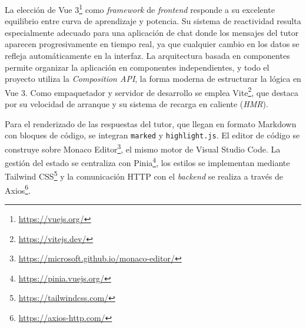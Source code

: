 La elección de Vue 3\footnote{\url{https://vuejs.org/}} como \textit{framework} de \textit{frontend} responde a su excelente equilibrio entre curva de aprendizaje y potencia. Su sistema de reactividad resulta especialmente adecuado para una aplicación de chat donde los mensajes del tutor aparecen progresivamente en tiempo real, ya que cualquier cambio en los datos se refleja automáticamente en la interfaz. La arquitectura basada en componentes permite organizar la aplicación en componentes independientes, y todo el proyecto utiliza la \textit{Composition API}, la forma moderna de estructurar la lógica en Vue 3. Como empaquetador y servidor de desarrollo se emplea Vite\footnote{\url{https://vitejs.dev/}}, que destaca por su velocidad de arranque y su sistema de recarga en caliente (\textit{HMR}).

Para el renderizado de las respuestas del tutor, que llegan en formato Markdown con bloques de código, se integran \texttt{marked} y \texttt{highlight.js}. El editor de código se construye sobre Monaco Editor\footnote{\url{https://microsoft.github.io/monaco-editor/}}, el mismo motor de Visual Studio Code. La gestión del estado se centraliza con Pinia\footnote{\url{https://pinia.vuejs.org/}}, los estilos se implementan mediante Tailwind CSS\footnote{\url{https://tailwindcss.com/}} y la comunicación HTTP con el \textit{backend} se realiza a través de Axios\footnote{\url{https://axios-http.com/}}.